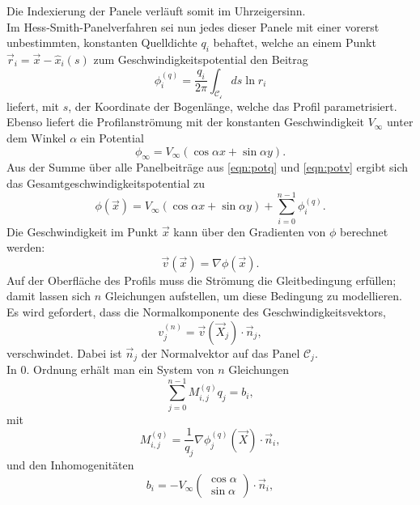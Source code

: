 Die Indexierung der Panele verläuft somit im Uhrzeigersinn. \\
Im Hess-Smith-Panelverfahren sei nun jedes dieser Panele mit einer vorerst unbestimmten, konstanten Quelldichte $q_i$ behaftet, welche an einem Punkt $\vec r_i =  \vec x - \hat x_i(s)$ zum Geschwindigkeitspotential den Beitrag
\begin{equation}
\label{eqn:potq}
\phi_i^{(q)} =  \frac{q_i}{2 \pi } \int_{\mathcal{C_i}} ds \ln r_i
\end{equation}
liefert, mit $s$, der Koordinate der Bogenlänge, welche das Profil parametrisiert. \\
Ebenso liefert die Profilanströmung mit der konstanten Geschwindigkeit $V_{\infty}$ unter dem Winkel $\alpha $ ein Potential
\begin{equation}
\label{eqn:potv}
\phi_{\infty} =  V_{\infty} (\cos{\alpha} x + \sin{\alpha} y).
\end{equation}
Aus der Summe über alle Panelbeiträge aus \eqref{eqn:potq} und \eqref{eqn:potv} ergibt sich das Gesamtgeschwindigkeitspotential zu
\begin{equation}
\label{eqn:potnovortex}
\phi(\vec x) =  V_{\infty} (\cos{\alpha} x + \sin{\alpha} y) + \sum_{i=0}^{n-1} \phi_i^{(q)}.
\end{equation}
Die Geschwindigkeit im Punkt $\vec x$  kann über den Gradienten von $\phi$ berechnet werden:
\begin{equation}
\vec v ( \vec x) =  \nabla  \phi (\vec x).
\end{equation}
Auf der Oberfläche des Profils muss die Strömung die Gleitbedingung erfüllen; damit lassen sich $n$ Gleichungen aufstellen, um diese Bedingung zu modellieren. Es wird gefordert, dass die Normalkomponente des Geschwindigkeitsvektors,
\begin{equation}
v_j^{(n)} =  \vec v(\vec X_j) \cdot \vec n_j,
\end{equation}
verschwindet. Dabei ist $\vec n_j$ der Normalvektor auf das Panel $\mathcal{C}_j$.\\
In 0. Ordnung erhält man ein System von $n$ Gleichungen
\begin{equation}
\label{eq:lgls1}
\sum_{j=0}^{n-1} M_{i,j}^{(q)}q_j =  b_i,
\end{equation}
mit
\begin{equation}
M_{i,j}^{(q)} = \frac{1}{q_j} \nabla \phi_j^{(q)} (\vec X) \cdot \vec n_i,
\end{equation}
und den Inhomogenitäten
\begin{equation}
b_i =  -V_{\infty} \left( \begin{matrix} \cos \alpha \\ \sin \alpha \end{matrix} \right) \cdot \vec n_i,
\end{equation}
